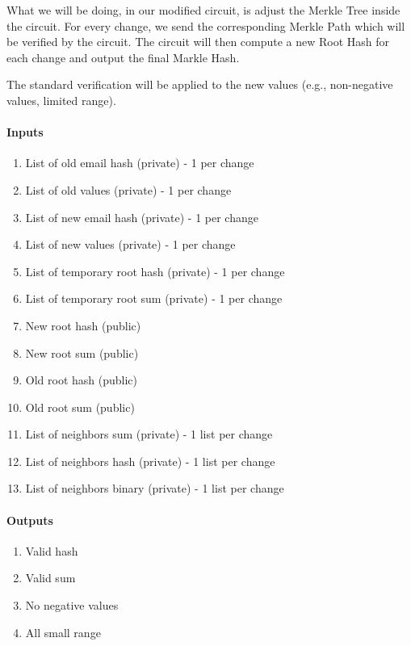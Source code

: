 What we will be doing, in our modified circuit, is adjust the Merkle Tree inside the circuit.
For every change, we send the corresponding Merkle Path which will be verified by the circuit.
The circuit will then compute a new Root Hash for each change and output the final Markle Hash.


The standard verification will be applied to the new values (e.g., non-negative values, limited range).


\paragraph{Inputs}
\begin{enumerate}


   \item List of old email hash (private) - 1 per change
  
   \item List of old values (private) - 1 per change


   \item List of new email hash (private) - 1 per change
  
   \item List of new values (private) - 1 per change


   \item List of temporary root hash (private) - 1 per change
  
   \item List of temporary root sum (private) - 1 per change


   \item New root hash (public)


   \item New root sum (public)


   \item Old root hash (public)


   \item Old root sum (public)


   \item List of neighbors sum (private) - 1 list per change


   \item List of neighbors hash (private) - 1 list per change


   \item List of neighbors binary (private) - 1 list per change
  
   \end{enumerate}


   \paragraph{Outputs}
   \begin{enumerate}
       \item Valid hash
       \item Valid sum
       \item No negative values
       \item All small range
       \end{enumerate}


